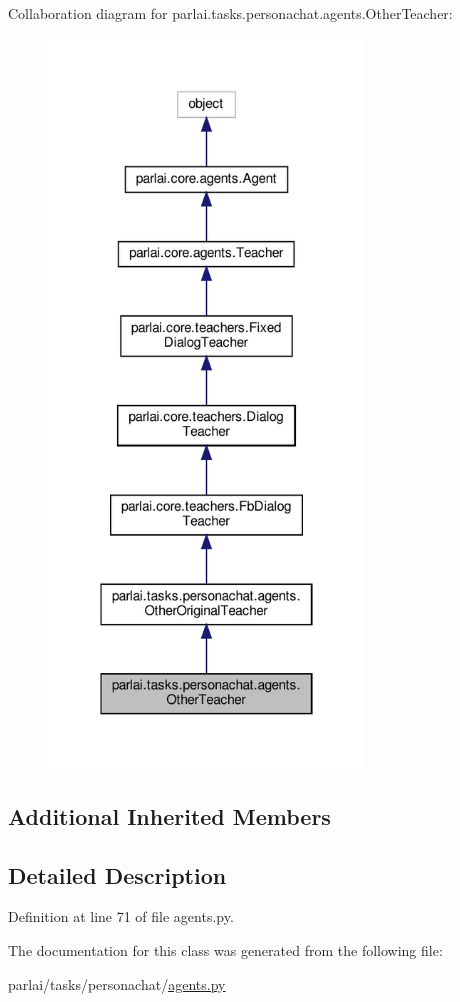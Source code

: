 Collaboration diagram for parlai.\+tasks.\+personachat.\+agents.\+Other\+Teacher\+:
\nopagebreak
\begin{figure}[H]
\begin{center}
\leavevmode
\includegraphics[width=238pt]{df/dee/classparlai_1_1tasks_1_1personachat_1_1agents_1_1OtherTeacher__coll__graph}
\end{center}
\end{figure}
\subsection*{Additional Inherited Members}


\subsection{Detailed Description}


Definition at line 71 of file agents.\+py.



The documentation for this class was generated from the following file\+:\begin{DoxyCompactItemize}
\item 
parlai/tasks/personachat/\hyperlink{parlai_2tasks_2personachat_2agents_8py}{agents.\+py}\end{DoxyCompactItemize}

